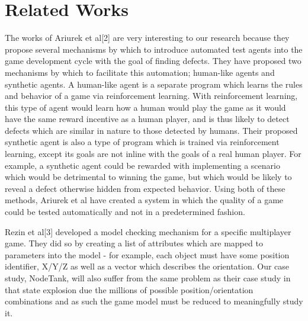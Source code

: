 \documentclass[conference]{IEEEtran}
\begin{document}
\section{Related Works}

The works of Ariurek et al[2] are very interesting to our research because they propose several mechanisms by which to introduce automated test agents into the game
development cycle with the goal of finding defects. They have proposed two mechanisms by which to facilitate this automation; human-like agents and synthetic agents.
A human-like agent is a separate program which learns the rules and behavior of a game via reinforcement learning. With reinforcement learning, this type of agent would
learn how a human would play the game as it would have the same reward incentive as a human player, and is thus likely to detect defects which are similar in nature to those
detected by humans. Their proposed synthetic agent is also a type of program which is trained via reinforcement learning, except its goals are not inline with the goals of a
real human player. For example, a synthetic agent could be rewarded with implementing a scenario which would be detrimental to winning the game, but which would be likely to
reveal a defect otherwise hidden from expected behavior. Using both of these methods, Ariurek et al have created a system in which the quality of a game could be tested automatically
and not in a predetermined fashion.

Rezin et al[3] developed a model checking mechanism for a specific multiplayer game. They did so by creating a list of attributes which are mapped to parameters into the model -
 for example, each object must have some position identifier, X/Y/Z as well as a vector which describes the orientation. Our case study, NodeTank, will also suffer from the same
 problem as their case study in that state explosion due the millions of possible position/orientation combinations and as such the game model must be reduced to meaningfully study it.
\end{document}
